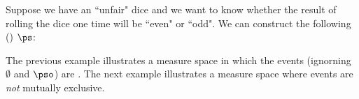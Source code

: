 \begin{example}
\label{ex:msr_even_odd_dice}
Suppose we have an ``unfair" dice and we want to know whether
the result of rolling the dice one time will be ``even" or ``odd".
We can construct the following  () $\ps$:

\end{example}

The previous example illustrates a 
measure space in which the events (ignorning $\emptyset$ and $\pso$)
are . 
The next example illustrates a measure space where events are {\em not} mutually exclusive.

